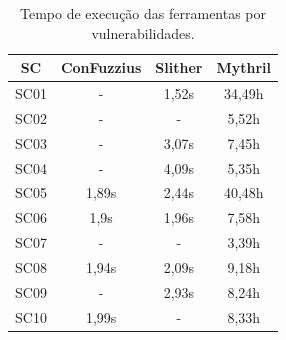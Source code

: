 \documentclass[12pt]{article}
\begin{document}

\begin{table}[!ht]
    \caption{Tempo de execução das ferramentas por vulnerabilidades.}
    \centering
    \begin{tabular}{|c|c|c|c|}
        \hline
        \textbf{SC} & \textbf{ConFuzzius} & \textbf{Slither} & \textbf{Mythril} \\
        \hline
        SC01 & - & 1,52s & 34,49h \\
        \hline
        SC02 & - & - & 5,52h \\
        \hline
        SC03 & - & 3,07s & 7,45h \\
        \hline
        SC04 & - & 4,09s & 5,35h \\
        \hline
        SC05 & 1,89s & 2,44s & 40,48h \\
        \hline
        SC06 & 1,9s & 1,96s & 7,58h \\
        \hline
        SC07 & - & - & 3,39h \\
        \hline
        SC08 & 1,94s & 2,09s & 9,18h \\
        \hline
        SC09 & - & 2,93s & 8,24h \\
        \hline
        SC10 & 1,99s & - & 8,33h \\
        \hline
    \end{tabular}
    \label{tab:analise-tempo}
\end{table}
\end{document}
